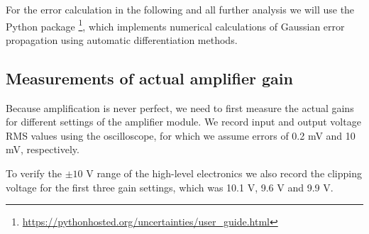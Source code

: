 For the error calculation in the following and all further analysis we will use the Python package \footnote{\url{https://pythonhosted.org/uncertainties/user_guide.html}}, which implements numerical calculations of Gaussian error propagation using automatic differentiation methods.

\subsection{Measurements of actual amplifier gain}

Because amplification is never perfect, we need to first measure the actual gains for different settings of the amplifier module. We record input and output voltage RMS values using the oscilloscope, for which we assume errors of 0.2 mV and 10 mV, respectively.

To verify the $\pm 10$ V range of the high-level electronics we also record the clipping voltage for the first three gain settings, which was 10.1 V, 9.6 V and 9.9 V.

